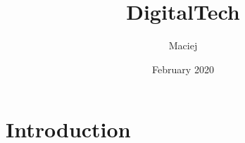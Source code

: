 \documentclass{article}
\title{DigitalTech}
\author{Maciej}
\date{February 2020}
\begin{document}
\maketitle

\section{Introduction}
\end{document}
